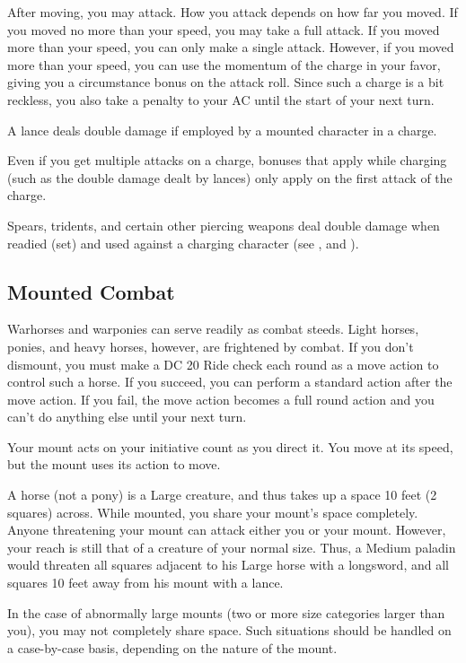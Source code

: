  After moving, you may attack. How you attack depends on how far you moved. If you moved no more than your speed, you may take a full attack. If you moved more than your speed, you can only make a single attack. However, if you moved more than your speed, you can use the momentum of the charge in your favor, giving you a  circumstance bonus on the attack roll. Since such a charge is a bit reckless, you also take a  penalty to your AC until the start of your next turn.

 A lance deals double damage if employed by a mounted character in a charge.

 Even if you get multiple attacks on a charge, bonuses that apply while charging (such as the double damage dealt by lances) only apply on the first attack of the charge.

 Spears, tridents, and certain other piercing weapons deal double damage when readied (set) and used against a charging character (see , and ).

\subsection{Mounted Combat}
 Warhorses and warponies can serve readily as combat steeds. Light horses, ponies, and heavy horses, however, are frightened by combat. If you don't dismount, you must make a DC 20 Ride check each round as a move action to control such a horse. If you succeed, you can perform a standard action after the move action. If you fail, the move action becomes a full round action and you can't do anything else until your next turn.

Your mount acts on your initiative count as you direct it. You move at its speed, but the mount uses its action to move.

 A horse (not a pony) is a Large creature, and thus takes up a space 10 feet (2 squares) across. While mounted, you share your mount's space completely. Anyone threatening your mount can attack either you or your mount. However, your reach is still that of a creature of your normal size. Thus, a Medium paladin would threaten all squares adjacent to his Large horse with a longsword, and all squares 10 feet away from his mount with a lance.

In the case of abnormally large mounts (two or more size categories larger than you), you may not completely share space. Such situations should be handled on a case-by-case basis, depending on the nature of the mount.

